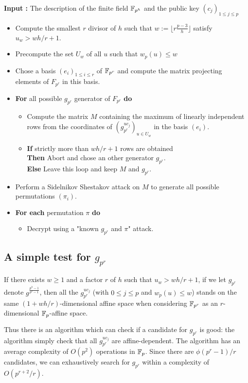 \documentclass[a4paper]{article}
\newcommand{\GF}[1]{\F_{#1}}
\begin{document}
\textbf{Input : } The description of the finite field $\mathbb{F}_{p^h}$ and the public key $(c_j)_{1 \leq j \leq p}$
\begin{itemize}
\item Compute the smallest $r$ divisor of $h$ such that $w := \lfloor r \frac{p-3}{h} \rfloor$ satisfy $u_w > wh/r+1$.

\item Precompute the set $U_w$ of all $u$ such that $w_p(u) \leq w$
\item Chose a basis $(e_i)_{1 \leq i \leq r}$ of $\mathbb{F}_{p^r}$ and compute the matrix projecting elements of $F_{p^r}$ in this basis.

\item \textbf{For} all possible $g_{p^r}$ generator of $F_{p^r}$ \textbf{do}
\begin{itemize}
\item Compute the matrix $M$ containing the maximum of linearly independent rows from the coordinates of $\left( g_{p^r}^{uc_j} \right)_{u \in U_w}$ in the basis $(e_i)$.

\item \textbf{If } strictly more than $wh/r+1$ rows are obtained\\
\textbf{Then } Abort and chose an other generator $g_{p^r}$. \\
\textbf{Else } Leave this loop and keep $M$ and $g_{p^r}$.
\end{itemize}
\item Perform a Sidelnikov Shestakov attack on $M$ to generate all possible permutations $(\pi_i)$.
\item \textbf{For each } permutation $\pi$ \textbf{ do }
\begin{itemize}
\item Decrypt using a "known $g_{p^r}$ and $\pi$" attack.
\end{itemize}
\end{itemize}



\subsection{A simple test for $g_{p^r}$}

\begin{theorem}
If there exists $w \geq 1$ and a factor $r$ of $h$ such that $u_w > wh/r + 1$, if we let $g_{p^r}$ denote $g^{\frac{p^h-1}{p^r-1}}$, then all the $g_{p^r}^{uc_j}$ (with $0 \leq j\leq p$ and $w_p(u) \leq w$) stands on the same $(1+wh/r)$-dimensional affine space when considering $\GF{p^r}$ as an $r$-dimensional $\GF{p}$-affine space.
\end{theorem}
Thus there is an algorithm which can check if a candidate for $g_{p^r}$ is good: the algorithm simply check that all $g_{p^r}^{uc_j}$ are affine-dependent. The algorithm has an average complexity of $O(p^2)$ operations in $\GF{p}$. Since there are $\phi(p^r-1)/r$ candidates, we can exhaustively search for $g_{p^r}$ within a complexity of $O(p^{r+2} /r)$.
\end{document}
